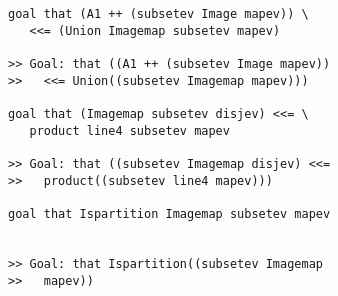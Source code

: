 \documentclass[12pt]{article}
\begin{document}
\begin{verbatim}
goal that (A1 ++ (subsetev Image mapev)) \
   <<= (Union Imagemap subsetev mapev)

>> Goal: that ((A1 ++ (subsetev Image mapev))
>>   <<= Union((subsetev Imagemap mapev)))

goal that (Imagemap subsetev disjev) <<= \
   product line4 subsetev mapev

>> Goal: that ((subsetev Imagemap disjev) <<=
>>   product((subsetev line4 mapev)))

goal that Ispartition Imagemap subsetev mapev


>> Goal: that Ispartition((subsetev Imagemap
>>   mapev))
\end{verbatim}
\end{document}
